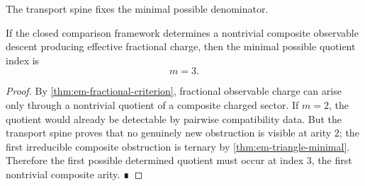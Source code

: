 The transport spine fixes the minimal possible denominator.
\begin{theorem}
	\label{thm:em-minimal-composite-index}
	If the closed comparison framework determines a nontrivial composite
	observable descent producing effective fractional charge, then the
	minimal possible quotient index is
	\[
		m=3.
	\]
\end{theorem}
\begin{proof}
	By \cref{thm:em-fractional-criterion}, fractional observable charge can
	arise only through a nontrivial quotient of a composite charged sector.
	If \(m=2\), the quotient would already be detectable by pairwise
	compatibility data.
	But the transport spine proves that no genuinely new obstruction is
	visible at arity \(2\); the first irreducible composite obstruction is
	ternary by \cref{thm:em-triangle-minimal}.
	Therefore the first possible determined quotient must occur at index \(3\),
	the first nontrivial composite arity. ∎
\end{proof}
